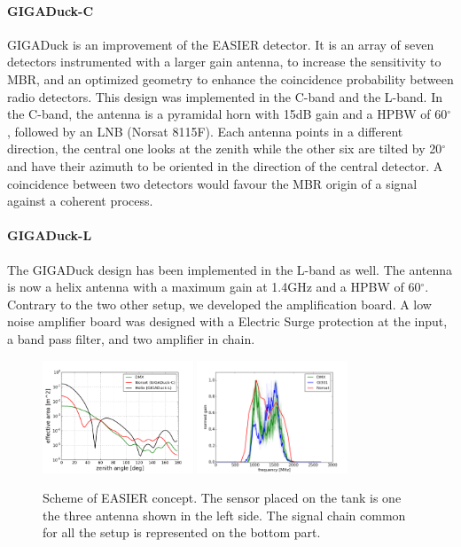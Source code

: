 \documentclass{PoS}
\begin{document}
\paragraph{GIGADuck-C}
GIGADuck is an improvement of the EASIER detector. It is an array of seven detectors instrumented with a larger gain antenna, to increase the sensitivity to MBR, and an optimized geometry to enhance the coincidence probability between radio detectors. This design was implemented in the C-band and the L-band. In the C-band, the antenna is a pyramidal horn with 15dB gain and a HPBW of 60$^\circ$, followed by an LNB (Norsat 8115F). Each antenna points in a different direction, the central one looks at the zenith while the other six are tilted by 20$^\circ$ and have their azimuth to be oriented in the direction of the central detector. A coincidence between two detectors would favour the MBR origin of a signal against a coherent process.
\paragraph{GIGADuck-L}
The GIGADuck design has been implemented in the L-band as well. The antenna is now a helix antenna with a maximum gain at 1.4GHz and a HPBW of 60$^\circ$. Contrary to the two other setup, we developed the amplification board. A low noise amplifier board was designed with a Electric Surge protection at the input, a band pass filter, and two amplifier in chain. 
\begin{figure}[h]
\centering
\includegraphics[width=0.4\textwidth]{effectiveareas.png}
\includegraphics[width=0.4\textwidth]{spectra3.png}

\caption{Scheme of EASIER concept. The sensor  placed on the tank is one the three antenna shown in the left side. The signal chain common for all the setup is represented on the bottom part.}
\label{fig:calib}
\end{figure}
\end{document}
